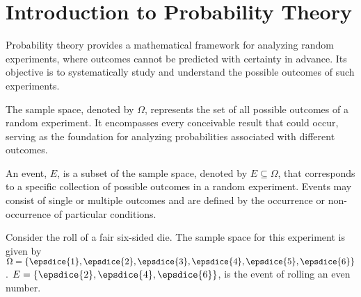 \chapter{Introduction to Probability Theory}
\label{chp:probaiblity_theory}
Probability theory provides a mathematical framework for analyzing random experiments, where outcomes cannot be predicted with certainty in advance. Its objective is to systematically study and understand the possible outcomes of such experiments.
\begin{definition}
	The sample space, denoted by $\Omega$, represents the set of all possible outcomes of a random experiment. It encompasses every conceivable result that could occur, serving as the foundation for analyzing probabilities associated with different outcomes.
\end{definition}

\begin{definition}[Event]
	An event, $E$, is a subset of the sample space, denoted by $E \subseteq \Omega$, that corresponds to a specific collection of possible outcomes in a random experiment. Events may consist of single or multiple outcomes and are defined by the occurrence or non-occurrence of particular conditions.
\end{definition}

\begin{example}
	\label{ex:die1}
	Consider the roll of a fair six-sided die. The sample space for this experiment is given by $\Omega = \{ \epsdice{1}, \epsdice{2}, \epsdice{3}, \epsdice{4}, \epsdice{5}, \epsdice{6} \}$. $E = \{\epsdice{2}, \epsdice{4}, \epsdice{6}\}$, is the event of rolling an even number. 
\end{example}

